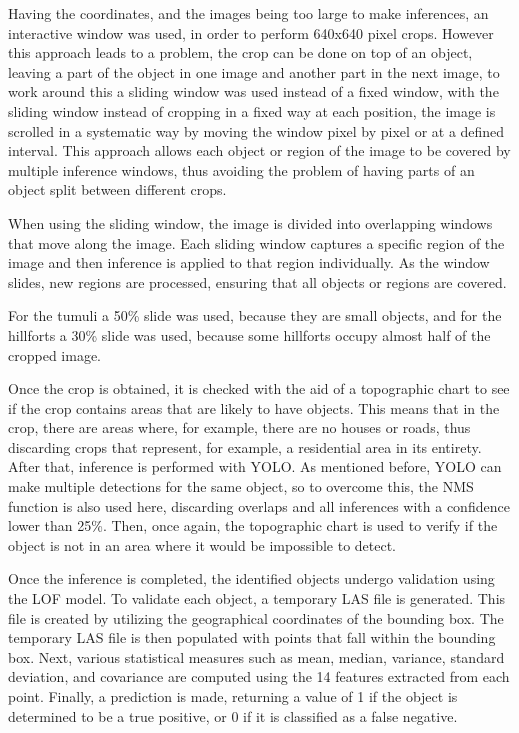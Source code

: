 Having the coordinates, and the images being too large to make inferences, an interactive window was used, in order to perform 640x640 pixel crops. However this approach leads to a problem, the crop can be done on top of an object, leaving a part of the object in one image and another part in the next image, to work around this a sliding window was used instead of a fixed window, with the sliding window instead of cropping in a fixed way at each position, the image is scrolled in a systematic way by moving the window pixel by pixel or at a defined interval. This approach allows each object or region of the image to be covered by multiple inference windows, thus avoiding the problem of having parts of an object split between different crops.

When using the sliding window, the image is divided into overlapping windows that move along the image. Each sliding window captures a specific region of the image and then inference is applied to that region individually. As the window slides, new regions are processed, ensuring that all objects or regions are covered.

For the tumuli a 50\% slide was used, because they are small objects, and for the hillforts a 30\% slide was used, because some hillforts occupy almost half of the cropped image.

Once the crop is obtained, it is checked with the aid of a topographic chart to see if the crop contains areas that are likely to have objects. This means that in the crop, there are areas where, for example, there are no houses or roads, thus discarding crops that represent, for example, a residential area in its entirety. After that, inference is performed with YOLO. As mentioned before, YOLO can make multiple detections for the same object, so to overcome this, the NMS function is also used here, discarding overlaps and all inferences with a confidence lower than 25\%. Then, once again, the topographic chart is used to verify if the object is not in an area where it would be impossible to detect.

Once the inference is completed, the identified objects undergo validation using the LOF model. To validate each object, a temporary LAS file is generated. This file is created by utilizing the geographical coordinates of the bounding box. The temporary LAS file is then populated with points that fall within the bounding box. Next, various statistical measures such as mean, median, variance, standard deviation, and covariance are computed using the 14 features extracted from each point. Finally, a prediction is made, returning a value of 1 if the object is determined to be a true positive, or 0 if it is classified as a false negative.

